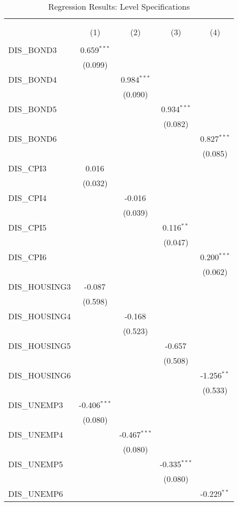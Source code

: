 \begin{table}[!htbp] \centering
  \caption{Regression Results: Level Specifications}
\begin{tabular}{@{\extracolsep{5pt}}lcccc}
\\[-1.8ex]\hline
\hline \\[-1.8ex]
\\[-1.8ex] & (1) & (2) & (3) & (4) \\
\hline \\[-1.8ex]
 DIS_BOND3 & 0.659$^{***}$ & & & \\
& (0.099) & & & \\
 DIS_BOND4 & & 0.984$^{***}$ & & \\
& & (0.090) & & \\
 DIS_BOND5 & & & 0.934$^{***}$ & \\
& & & (0.082) & \\
 DIS_BOND6 & & & & 0.827$^{***}$ \\
& & & & (0.085) \\
 DIS_CPI3 & 0.016$^{}$ & & & \\
& (0.032) & & & \\
 DIS_CPI4 & & -0.016$^{}$ & & \\
& & (0.039) & & \\
 DIS_CPI5 & & & 0.116$^{**}$ & \\
& & & (0.047) & \\
 DIS_CPI6 & & & & 0.200$^{***}$ \\
& & & & (0.062) \\
 DIS_HOUSING3 & -0.087$^{}$ & & & \\
& (0.598) & & & \\
 DIS_HOUSING4 & & -0.168$^{}$ & & \\
& & (0.523) & & \\
 DIS_HOUSING5 & & & -0.657$^{}$ & \\
& & & (0.508) & \\
 DIS_HOUSING6 & & & & -1.256$^{**}$ \\
& & & & (0.533) \\
 DIS_UNEMP3 & -0.406$^{***}$ & & & \\
& (0.080) & & & \\
 DIS_UNEMP4 & & -0.467$^{***}$ & & \\
& & (0.080) & & \\
 DIS_UNEMP5 & & & -0.335$^{***}$ & \\
& & & (0.080) & \\
 DIS_UNEMP6 & & & & -0.229$^{**}$ \\

\end{tabular}
\end{table}
